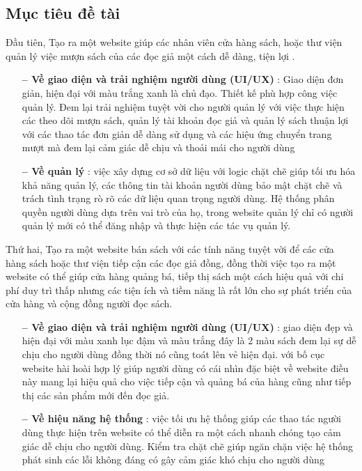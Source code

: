 \subsection{Mục tiêu đề tài}
Đầu tiên, Tạo ra một website giúp các nhân viên cửa hàng sách, hoặc thư viện quản lý việc mượn sách của các đọc giả một cách dễ dàng, tiện lợi 
.\par
\begin{itemize}[align=left, leftmargin=2cm]
  \item[\textbf{-- Về giao diện và trải nghiệm người dùng (UI/UX)}]:
Giao diện đơn giản, hiện đại với màu trắng xanh là chủ đạo. Thiết kế phù hợp công việc quản lý. Đem lại trải nghiệm tuyệt vời cho người quản lý với việc thực hiện các theo dõi mượn sách, quản lý tài khoản đọc giả và quản lý sách thuận lợi với các thao tác đơn giản dễ dàng sử dụng và các hiệu ứng chuyển trang mượt mà đem lại cảm giác dễ chịu và thoải mái cho người dùng \par
  \item[\textbf{-- Về quản lý}]:
việc xây dựng cơ sở dữ liệu với logic chặt chẽ  giúp tối ưu hóa khả năng quản lý, các thông tin tài khoản người dùng bảo mật chặt chẽ và trách tình trạng rò rõ các dữ liệu quan trọng người dùng. Hệ thống  phân quyền người dùng dựa trên vai trò của họ, trong website quản lý chỉ có người quản lý mới có thể đăng nhập và thực hiện các tác vụ quản lý.  \par
\end{itemize}

Thứ hai, Tạo ra một website bán sách với các tính năng tuyệt vời để các cửa hàng sách hoặc thư viện tiếp cận các đọc giả đồng, đồng thời việc tạo ra một website có thể giúp cửa hàng quảng bá, tiếp thị sách một cách hiệu quả với chi phí duy trì thấp nhưng các tiện ích và tiềm năng là rất lớn cho sự phát triển của cửa hàng và cộng đồng người đọc sách.\par
\begin{itemize}[align=left, leftmargin=2cm]
  \item[\textbf{-- Về giao diện và trải nghiệm người dùng (UI/UX)}]:
giao diện đẹp và hiện đại với màu xanh lục đậm và màu trắng đây là 2 màu sách đem lại sự dễ chịu cho người dùng đồng thời nó cũng toát lên vẻ hiện đại. với bố cục website hài hoài hợp lý giúp người dùng có cái nhìn đặc biệt về website  điều này mang lại hiệu quả cho việc tiếp cận và quảng bá của hàng cũng như tiếp thị các sản phẩm mới đến đọc giả. \par
  \item[\textbf{-- Về hiệu năng hệ thống}]:
việc tối ưu  hệ thống giúp các thao tác người dùng thực hiện trên website có thể diễn ra một cách nhanh chóng tạo cảm giác dễ chịu cho người dùng. Kiểm tra chặt chẽ giúp ngăn chặn việc hệ thống phát sinh các lỗi không đáng có gây cảm giác khó chịu cho người dùng \par
\end{itemize}

